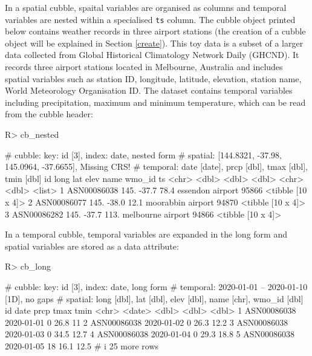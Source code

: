 \documentclass[
  shortnames]{jss}
\begin{document}
In a spatial cubble, spaital variables are organised as columns and temporal variables are nested within a specialised \texttt{ts} column. The cubble object printed below contains weather records in three airport stations (the creation of a cubble object will be explained in Section \ref{create}). This toy data is a subset of a larger data  collected from Global Historical Climatology Network Daily (GHCND). It records three airport stations located in Melbourne, Australia and includes spatial variables such as station ID, longitude, latitude, elevation, station name, World Meteorology Organisation ID. The dataset contains temporal variables including precipitation, maximum and minimum temperature, which can be read from the cubble header:

\begin{CodeChunk}
\begin{CodeInput}
R> cb_nested
\end{CodeInput}
\begin{CodeOutput}
# cubble:   key: id [3], index: date, nested form
# spatial:  [144.8321, -37.98, 145.0964, -37.6655], Missing CRS!
# temporal: date [date], prcp [dbl], tmax [dbl], tmin [dbl]
  id           long   lat  elev name              wmo_id ts               
  <chr>       <dbl> <dbl> <dbl> <chr>              <dbl> <list>           
1 ASN00086038  145. -37.7  78.4 essendon airport   95866 <tibble [10 x 4]>
2 ASN00086077  145. -38.0  12.1 moorabbin airport  94870 <tibble [10 x 4]>
3 ASN00086282  145. -37.7 113.  melbourne airport  94866 <tibble [10 x 4]>
\end{CodeOutput}
\end{CodeChunk}

In a temporal cubble, temporal variables are expanded in the long form and spatial variables are stored as a data attribute:

\begin{CodeChunk}
\begin{CodeInput}
R> cb_long
\end{CodeInput}
\begin{CodeOutput}
# cubble:   key: id [3], index: date, long form
# temporal: 2020-01-01 -- 2020-01-10 [1D], no gaps
# spatial:  long [dbl], lat [dbl], elev [dbl], name [chr], wmo_id [dbl]
  id          date        prcp  tmax  tmin
  <chr>       <date>     <dbl> <dbl> <dbl>
1 ASN00086038 2020-01-01     0  26.8  11  
2 ASN00086038 2020-01-02     0  26.3  12.2
3 ASN00086038 2020-01-03     0  34.5  12.7
4 ASN00086038 2020-01-04     0  29.3  18.8
5 ASN00086038 2020-01-05    18  16.1  12.5
# i 25 more rows
\end{CodeOutput}
\end{CodeChunk}
\end{document}
